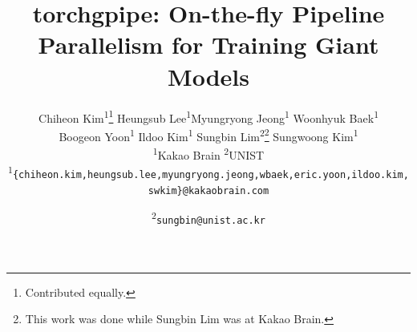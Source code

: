 \documentclass[10pt,twocolumn,letterpaper]{article}
\makeatletter
\newcommand{\printfnsymbol}[1]{%
  \textsuperscript{\@fnsymbol{#1}}%
}
\makeatother
\begin{document}
\title{torchgpipe: On-the-fly Pipeline Parallelism for Training Giant Models}



\author{Chiheon Kim\textsuperscript{1}\thanks{Contributed equally.} \qquad Heungsub Lee\textsuperscript{1}\footnotemark[1]
\qquad Myungryong Jeong\textsuperscript{1} \qquad Woonhyuk Baek\textsuperscript{1} \\
Boogeon Yoon\textsuperscript{1} \qquad Ildoo Kim\textsuperscript{1} \qquad Sungbin Lim\textsuperscript{2}\thanks{This work was done while Sungbin Lim was at Kakao Brain.} \qquad Sungwoong Kim\textsuperscript{1}\\
\textsuperscript{1}Kakao Brain \qquad \textsuperscript{2}UNIST \\
\textsuperscript{1}{\tt\small \{chiheon.kim,heungsub.lee,myungryong.jeong,wbaek,eric.yoon,ildoo.kim,swkim\}@kakaobrain.com} \and \textsuperscript{2}{\tt\small sungbin@unist.ac.kr}
}
\end{document}

